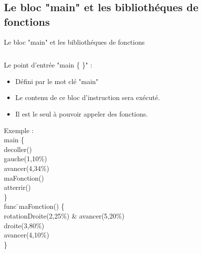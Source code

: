 \documentclass{bredelebeamer}
\begin{document}
\subsection{Le bloc "main" et les bibliothéques de fonctions} 
\begin{frame}{Le bloc "main" et les bibliothéques de fonctions} 

\begin{columns}

\begin{column}{0.5\textwidth}


Le point d'entrée "main \{ \}" :\\
\begin{itemize}
\item Défini par le mot clé "main"
\item Le contenu de ce bloc d'instruction sera exécuté.
\item Il est le seul à pouvoir appeler des fonctions.
\end{itemize}\pause

\begin{tabbing}
Exemple : \=\\
	\>\color{Framarouge}main  \{\=\\ 
	\>\>\color{Framarouge}decoller()\\
	\>\>\color{Framarouge}gauche(\color{black}1\color{Framarouge},\color{Framagris}10\%\color{Framarouge})\\ 
	\>\>\color{Framarouge}avancer(\color{black}4\color{Framarouge},\color{Framagris}34\%\color{Framarouge})\\
	\>\>\color{Framarouge}maFonction()\\ 
	\>\>\color{Framarouge}atterrir()\\
	\>\color{Framarouge}\}\\
	
	\>\color{Framarouge}func \=\color{black}maFonction\color{Framarouge}() \{\\ 
	\>\>\color{Framarouge}rotationDroite(\color{black}2\color{Framarouge},\color{Framagris}25\%\color{Framarouge}) \& 
	\color{Framarouge}avancer(\color{black}5\color{Framarouge},\color{Framagris}20\%\color{Framarouge})\\ 
	\>\>\color{Framarouge}droite(\color{black}3\color{Framarouge},\color{Framagris}80\%\color{Framarouge})\\ 
	\>\>\color{Framarouge}avancer(\color{black}4\color{Framarouge},\color{Framagris}10\%\color{Framarouge})\\ 
	\>\color{Framarouge}\}\pause


\end{tabbing}
\end{column}
\end{columns}
\end{frame}
\end{document}
